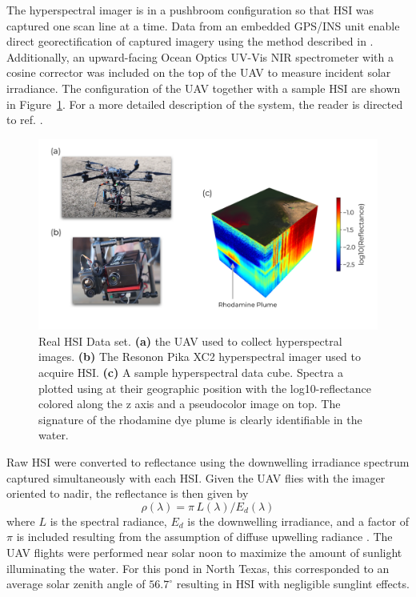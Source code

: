 \documentclass[remotesensing,article,submit,pdftex,moreauthors]{Definitions/mdpi}
\begin{document}
The hyperspectral imager is in a pushbroom configuration so that HSI was captured one scan line at a time. Data from an embedded GPS/INS unit enable direct georectification of captured imagery using the method described in \cite{muller2002program}. Additionally, an upward-facing Ocean Optics UV-Vis NIR spectrometer with a cosine corrector was included on the top of the UAV to measure incident solar irradiance. The configuration of the UAV together with a sample HSI are shown in Figure~\ref{fig:robotteam-data}. For a more detailed description of the system, the reader is directed to ref. \cite{robot-team-1, robot-team-2}.

\begin{figure}[t]
\includegraphics[width=\columnwidth]{methods/robot-team/robot-team-overview.pdf}
\caption{Real HSI Data set. \textbf{(a)} the UAV used to collect hyperspectral images. \textbf{(b)} The Resonon Pika XC2 hyperspectral imager used to acquire HSI. \textbf{(c)} A sample hyperspectral data cube. Spectra a plotted using at their geographic position with the log10-reflectance colored along the z axis and a pseudocolor image on top. The signature of the rhodamine dye plume is clearly identifiable in the water. \label{fig:robotteam-data}}
\end{figure}  

Raw HSI were converted to reflectance using the downwelling irradiance spectrum captured simultaneously with each HSI. Given the UAV flies with the imager oriented to nadir, the reflectance is then given by 
\begin{equation}
    \rho(\lambda) = \pi\,L(\lambda)/E_d(\lambda)
\end{equation}
where $L$ is the spectral radiance, $E_d$ is the downwelling irradiance, and a factor of $\pi$ is included resulting from the assumption of diffuse upwelling radiance \cite{ruddick2019review}. The UAV flights were performed near solar noon to maximize the amount of sunlight illuminating the water. For this pond in North Texas, this corresponded to an average solar zenith angle of $56.7^{\circ}$ resulting in HSI with negligible sunglint effects.
\end{document}
